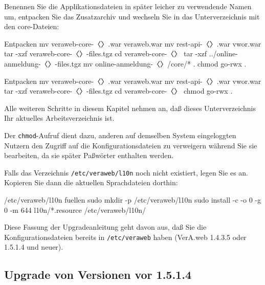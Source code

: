 \begin{minipage}{\textwidth}
Benennen Sie die Applikationsdateien in später leicher zu
verwendende Namen um, entpacken Sie das Zusatzarchiv und
wechseln Sie in das Unterverzeichnis mit den core-Dateien:

\ifoa
\begin{lstdump}{Entpacken}
mv veraweb-core-〈\lstdumpesc{\vwiaverssw}〉.war veraweb.war
mv rest-api-〈\lstdumpesc{\vwiaverssw}〉.war vwor.war
tar -xzf veraweb-core-〈\lstdumpesc{\vwiaverssw}〉-files.tgz
cd veraweb-core-〈\lstdumpesc{\vwiaverssw}〉
tar -xzf ../online-anmeldung-〈\lstdumpesc{\vwiaverssw}〉-files.tgz
mv online-anmeldung-〈\lstdumpesc{\vwiaverssw}〉/core/* .
chmod go-rwx .
\end{lstdump}
\else%
\begin{lstdump}{Entpacken}
mv veraweb-core-〈\lstdumpesc{\vwiaverssw}〉.war veraweb.war
mv rest-api-〈\lstdumpesc{\vwiaverssw}〉.war vwor.war
tar -xzf veraweb-core-〈\lstdumpesc{\vwiaverssw}〉-files.tgz
cd veraweb-core-〈\lstdumpesc{\vwiaverssw}〉
chmod go-rwx .
\end{lstdump}
\fi%
\end{minipage}

Alle weiteren Schritte in diesem Kapitel nehmen an, daß dieses
Unterverzeichnis Ihr aktuelles Arbeitsverzeichnis ist.

Der \texttt{chmod}-Aufruf dient dazu, anderen auf demselben System
eingeloggten Nutzern den Zugriff auf die Konfigurationsdateien zu
verweigern während Sie sie bearbeiten, da sie später Paßwörter
enthalten werden.

\begin{minipage}{\textwidth}
Falls das Verzeichnis \texttt{/etc/veraweb/l10n} noch nicht existiert,
legen Sie es an. Kopieren Sie dann die aktuellen Sprachdateien dorthin:

\begin{lstdump}{/etc/veraweb/l10n fuellen}
sudo mkdir -p /etc/veraweb/l10n
sudo install -c -o 0 -g 0 -m 644 l10n/*.resource /etc/veraweb/l10n/
\end{lstdump}
\end{minipage}

\ifvwconfigsinetcalready
Diese Fassung der Upgradeanleitung geht davon aus, daß Sie die
Konfigurationsdateien bereits in \texttt{/etc/veraweb} haben
(VerA.web 1.4.3.5 oder 1.5.1.4 und neuer).
\else%

\subsection{Upgrade von Versionen vor 1.5.1.4}\label{subsec:upgrade-1514}

